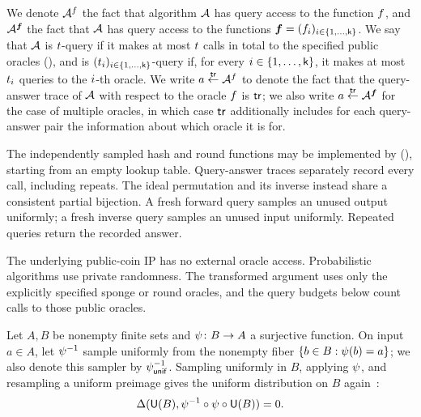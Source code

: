 We denote \(\mathcal{A}^{f}\) the fact that algorithm \(\mathcal{A}\) has query access to the function \(f\), and \(\mathcal{A}^{\boldsymbol{f}}\) the fact that \(\mathcal{A}\) has query access to the functions \(\boldsymbol{f} = (f_{i})_{i \in \{1,\ldots,\mathsf{k}\}}\). We say that \(\mathcal{A}\) is \(t\)-query if it makes at most \(t\) calls in total to the specified public oracles (), and is \((t_{i})_{i \in \{1,\ldots,\mathsf{k}\}}\)-query if, for every \(i \in \{1,\ldots,\mathsf{k}\}\), it makes at most \(t_{i}\) queries to the \(i\)-th oracle. We write \(a \stackrel{\mathsf{tr}}{\gets} \mathcal{A}^{f}\) to denote the fact that the query-answer trace of \(\mathcal{A}\) with respect to the oracle \(f\) is \(\mathsf{tr}\); we also write \(a \stackrel{\mathsf{tr}}{\gets} \mathcal{A}^{\boldsymbol{f}}\) for the case of multiple oracles, in which case \(\mathsf{tr}\) additionally includes for each query-answer pair the information about which oracle it is for.

The independently sampled hash and round functions may be implemented by  (), starting from an empty lookup table. Query-answer traces separately record every call, including repeats. The ideal permutation and its inverse instead share a consistent partial bijection. A fresh forward query samples an unused output uniformly; a fresh inverse query samples an unused input uniformly. Repeated queries return the recorded answer.

The underlying public-coin IP has no external oracle access. Probabilistic algorithms use private randomness. The transformed argument uses only the explicitly specified sponge or round oracles, and the query budgets below count calls to those public oracles.

\begin{lemma}
\label{lem:dsfs_bias_map_and_back}
Let \(A,B\) be nonempty finite sets and \(\psi\colon B\to A\) a surjective function. On input \(a\in A\), let \(\psi^{-1}\) sample uniformly from the nonempty fiber \(\{b\in B:\psi(b)=a\}\); we also denote this sampler by \(\psi^{-1}_{\mathsf{unif}}\). Sampling uniformly in \(B\), applying \(\psi\), and resampling a uniform preimage gives the uniform distribution on \(B\) again~\cite[Lemma~3.2]{CO25}:
\begin{equation*}
\Delta(\mathsf{U}(B),\psi^{-1}\circ\psi\circ\mathsf{U}(B))=0.
\end{equation*}
\leanok
\end{lemma}

